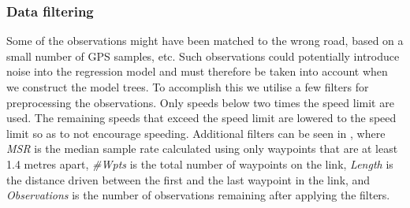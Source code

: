 \subsubsection{Data filtering}
Some of the observations might have been matched to the wrong road, based on a small number of GPS samples, etc. Such observations could potentially introduce noise into the regression model and must therefore be taken into account when we construct the model trees. To accomplish this we utilise a few filters for preprocessing the observations. Only speeds below two times the speed limit are used. The remaining speeds that exceed the speed limit are lowered to the speed limit so as to not encourage speeding. Additional filters can be seen in , where \emph{MSR} is the median sample rate calculated using only waypoints that are at least 1.4 metres apart, \emph{\#Wpts} is the total number of waypoints on the link, \emph{Length} is the distance driven between the first and the last waypoint in the link, and \emph{Observations} is the number of observations remaining after applying the filters.

